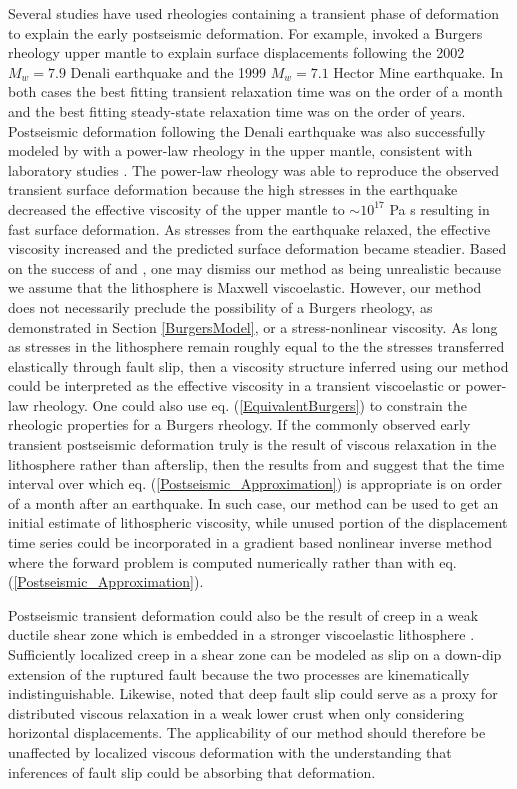 \documentclass[extra,mreferee]{gji}
\begin{document}
Several studies have used rheologies containing a transient phase of
deformation to explain the early postseismic deformation.  For
example, \citet{P2003,P2005} invoked a Burgers rheology upper mantle
to explain surface displacements following the 2002 $M_w=7.9$ Denali
earthquake and the 1999 $M_w=7.1$ Hector Mine earthquake.  In both
cases the best fitting transient relaxation time was on the order of a
month and the best fitting steady-state relaxation time was on the
order of years.  Postseismic deformation following the Denali
earthquake was also successfully modeled by \citet{F2006b} with a
power-law rheology in the upper mantle, consistent with laboratory
studies \citep[e.g.][]{KK1987}.  The power-law rheology was able to
reproduce the observed transient surface deformation because the high
stresses in the earthquake decreased the effective viscosity of the
upper mantle to $\sim10^{17}$ Pa s resulting in fast surface
deformation.  As stresses from the earthquake relaxed, the effective
viscosity increased and the predicted surface deformation became
steadier. Based on the success of \citet{P2003,P2005} and
\citet{F2006b}, one may dismiss our method as being unrealistic
because we assume that the lithosphere is Maxwell viscoelastic.
However, our method does not necessarily preclude the possibility of a
Burgers rheology, as demonstrated in Section \ref{BurgersModel}, or a
stress-nonlinear viscosity.  As long as stresses in the lithosphere
remain roughly equal to the the stresses transferred elastically
through fault slip, then a viscosity structure inferred using our
method could be interpreted as the effective viscosity in a transient
viscoelastic or power-law rheology.  One could also use
eq. (\ref{EquivalentBurgers}) to constrain the rheologic properties
for a Burgers rheology.  If the commonly observed early transient
postseismic deformation truly is the result of viscous relaxation in
the lithosphere rather than afterslip, then the results from
\citet{P2003,P2005} and \citet{F2006b} suggest that the time interval
over which eq. (\ref{Postseismic_Approximation}) is appropriate is on
order of a month after an earthquake.  In such case, our method can be
used to get an initial estimate of lithospheric viscosity, while
unused portion of the displacement time series could be incorporated
in a gradient based nonlinear inverse method where the forward problem
is computed numerically rather than with
eq. (\ref{Postseismic_Approximation}).

Postseismic transient deformation could also be the result of creep in
a weak ductile shear zone which is embedded in a stronger viscoelastic
lithosphere \citep[e.g.][]{HZ2014}. Sufficiently localized creep in a
shear zone can be modeled as slip on a down-dip extension of the
ruptured fault \citep[e.g.][]{H2002,KS2003,JS2004} because the two
processes are kinematically indistinguishable.  Likewise,
\citet{F2006b} noted that deep fault slip could serve as a proxy for
distributed viscous relaxation in a weak lower crust when only
considering horizontal displacements. The applicability of our method
should therefore be unaffected by localized viscous deformation with
the understanding that inferences of fault slip could be absorbing
that deformation.
\end{document}
